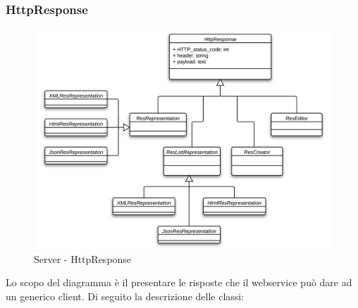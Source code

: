 \subsubsection{HttpResponse}

\begin{figure}[H]
\centering
\includegraphics[scale=0.55]{images/Server/HttpResponse.png}
\caption{Server - HttpResponse}
\end{figure}

Lo scopo del diagramma è il presentare le risposte che il webservice può dare ad un generico client. Di seguito la descrizione delle classi:

